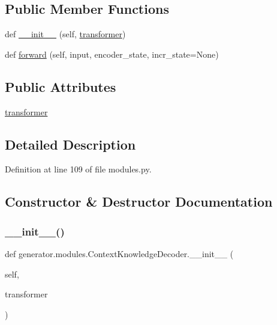 \subsection*{Public Member Functions}
\begin{DoxyCompactItemize}
\item 
def \hyperlink{classgenerator_1_1modules_1_1ContextKnowledgeDecoder_a88b449ff865a80cc487d2c0c51f751d7}{\+\_\+\+\_\+init\+\_\+\+\_\+} (self, \hyperlink{classgenerator_1_1modules_1_1ContextKnowledgeDecoder_a0e32b662447578af9e827b9a310047be}{transformer})
\item 
def \hyperlink{classgenerator_1_1modules_1_1ContextKnowledgeDecoder_a714ee85450e8d0c03fb12ed7b086ac38}{forward} (self, input, encoder\+\_\+state, incr\+\_\+state=None)
\end{DoxyCompactItemize}
\subsection*{Public Attributes}
\begin{DoxyCompactItemize}
\item 
\hyperlink{classgenerator_1_1modules_1_1ContextKnowledgeDecoder_a0e32b662447578af9e827b9a310047be}{transformer}
\end{DoxyCompactItemize}


\subsection{Detailed Description}


Definition at line 109 of file modules.\+py.



\subsection{Constructor \& Destructor Documentation}
\mbox{\label{classgenerator_1_1modules_1_1ContextKnowledgeDecoder_a88b449ff865a80cc487d2c0c51f751d7}} 
\subsubsection{\texorpdfstring{\+\_\+\+\_\+init\+\_\+\+\_\+()}{\_\_init\_\_()}}
{\footnotesize\ttfamily def generator.\+modules.\+Context\+Knowledge\+Decoder.\+\_\+\+\_\+init\+\_\+\+\_\+ (\begin{DoxyParamCaption}\item[{}]{self,  }\item[{}]{transformer }\end{DoxyParamCaption})}



